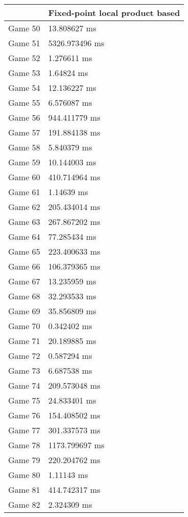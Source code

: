 \begin{multicols}{2}
\begin{tabular}{|l|l|}
	\hline
	& Fixed-point local product based \\ \hline
	Game 50 & 13.808627 ms \\ \hline
	Game 51 & 5326.973496 ms \\ \hline
	Game 52 & 1.276611 ms \\ \hline
	Game 53 & 1.64824 ms \\ \hline
	Game 54 & 12.136227 ms \\ \hline
	Game 55 & 6.576087 ms \\ \hline
	Game 56 & 944.411779 ms \\ \hline
	Game 57 & 191.884138 ms \\ \hline
	Game 58 & 5.840379 ms \\ \hline
	Game 59 & 10.144003 ms \\ \hline
	Game 60 & 410.714964 ms \\ \hline
	Game 61 & 1.14639 ms \\ \hline
	Game 62 & 205.434014 ms \\ \hline
	Game 63 & 267.867202 ms \\ \hline
	Game 64 & 77.285434 ms \\ \hline
	Game 65 & 223.400633 ms \\ \hline
	Game 66 & 106.379365 ms \\ \hline
	Game 67 & 13.235959 ms \\ \hline
	Game 68 & 32.293533 ms \\ \hline
	Game 69 & 35.856809 ms \\ \hline
	Game 70 & 0.342402 ms \\ \hline
	Game 71 & 20.189885 ms \\ \hline
	Game 72 & 0.587294 ms \\ \hline
	Game 73 & 6.687538 ms \\ \hline
	Game 74 & 209.573048 ms \\ \hline
	Game 75 & 24.833401 ms \\ \hline
	Game 76 & 154.408502 ms \\ \hline
	Game 77 & 301.337573 ms \\ \hline
	Game 78 & 1173.799697 ms \\ \hline
	Game 79 & 220.204762 ms \\ \hline
	Game 80 & 1.11143 ms \\ \hline
	Game 81 & 414.742317 ms \\ \hline
	Game 82 & 2.324309 ms \\ \hline

\end{tabular}
\end{multicols}
